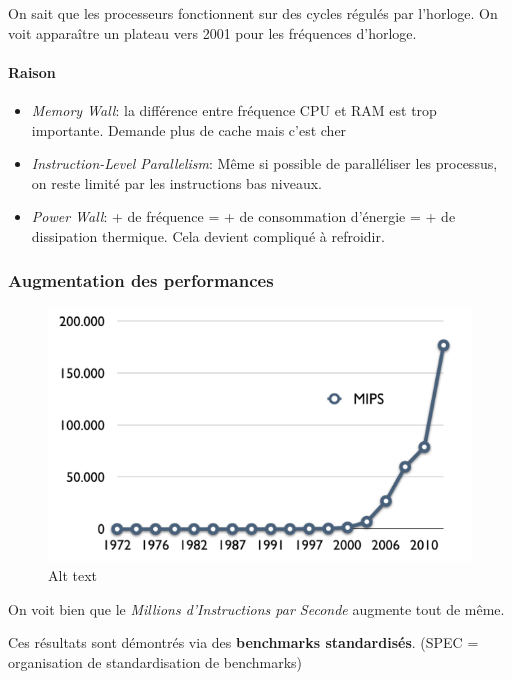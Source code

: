 On sait que les processeurs fonctionnent sur des cycles régulés par
l'horloge. On voit apparaître un plateau vers 2001 pour les fréquences
d'horloge.

\paragraph{Raison}\label{raison}

\begin{itemize}
\tightlist
\item
  \emph{Memory Wall}: la différence entre fréquence CPU et RAM est trop
  importante. Demande plus de cache mais c'est cher
\item
  \emph{Instruction-Level Parallelism}: Même si possible de paralléliser
  les processus, on reste limité par les instructions bas niveaux.
\item
  \emph{Power Wall}: + de fréquence = + de consommation d'énergie = + de
  dissipation thermique. Cela devient compliqué à refroidir.
\end{itemize}

\subsubsection{Augmentation des
performances}\label{augmentation-des-performances}

\begin{figure}
\centering
\includegraphics{image-22.png}
\caption{Alt text}
\end{figure}

On voit bien que le \emph{Millions d'Instructions par Seconde} augmente
tout de même.

Ces résultats sont démontrés via des \textbf{benchmarks standardisés}.
(SPEC = organisation de standardisation de benchmarks)

